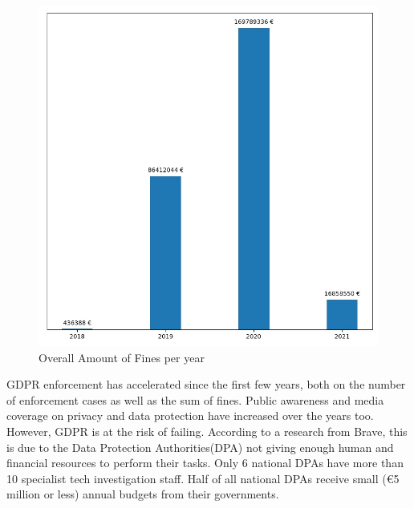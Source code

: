 \documentclass[12pt]{article}
\begin{document}
	\begin{multicols}{2}
	\begin{figure}
		[H]\centering\includegraphics[width=1.0\linewidth]{graphs/SumOfFinesperYear}
		\caption{Overall Amount of Fines per year }
	 \end{figure}
\justify
	GDPR enforcement has accelerated since the first few years, both on the number of enforcement cases as well as the sum of fines. Public awareness and media coverage on privacy and data protection have increased over the years too. However, GDPR is at the risk of failing. According to a research from Brave, this is due to the Data Protection Authorities(DPA) not giving enough human and financial resources to perform their tasks. Only 6 national DPAs have more than 10 specialist tech investigation staff. Half of all national DPAs receive small (€5 million or less) annual budgets from their governments.
	\end{multicols}



\newpage



\end{document}
